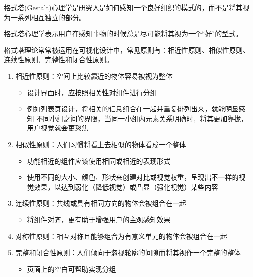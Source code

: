 \begin{solution}
格式塔(Gestalt)心理学是研究人是如何感知一个良好组织的模式的，而不是将其视为一系列相互独立的部分。

格式塔心理学表示用户在感知事物的时候总是尽可能将其视为一个“好”的型式。

格式塔理论常常被运用在可视化设计中，常见原则有：相近性原则、相似性原则、连续性原则、完整性和闭合性原则。
\begin{enumerate}[label=\arabic*.]
    \item 相近性原则：空间上比较靠近的物体容易被视为整体
    \vspace{-0.3em}
    \begin{itemize}
        \item 设计界面时，应按照相关性对组件进行分组
        \item 例如列表页设计，将相关的信息组合在一起并重复排列出来，就能明显感知 不同小组之间的界限，当同一小组内元素关系明确时，将其更加靠拢，用户视觉就会更聚焦
    \end{itemize}
    \item 相似性原则：人们习惯将看上去相似的物体看成一个整体
    \vspace{-0.3em}
    \begin{itemize}
        \item 功能相近的组件应该使用相同或相近的表现形式
        \item 使用不同的大小、颜色、形状来创建对比或视觉权重，呈现出不一样的视觉效果，以达到弱化（降低视觉）或凸显（强化视觉）某些内容
    \end{itemize}
    \item 连续性原则：共线或具有相同方向的物体会被组合在一起
    \vspace{-0.3em}
    \begin{itemize}
        \item 将组件对齐，更有助于增强用户的主观感知效果
    \end{itemize}
    \item 对称性原则：相互对称且能够组合为有意义单元的物体会被组合在一起
    \item 完整和闭合性原则：人们倾向于忽视轮廓的间隙而将其视作一个完整的整体
    \vspace{-0.3em}
    \begin{itemize}
        \item 页面上的空白可帮助实现分组
    \end{itemize}
\end{enumerate}
\end{solution}


